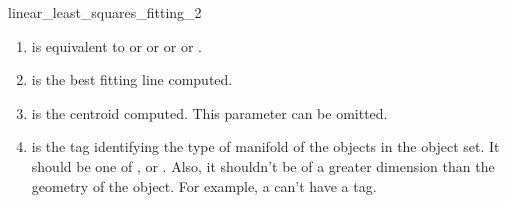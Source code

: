 \begin{ccRefFunction}{linear_least_squares_fitting_2}

\begin{enumerate}
   \item  {} is equivalent to  or 
           or  or  or
          .
   \item  {} is the best fitting line computed.
   \item  {} is the centroid computed. This parameter can be
          omitted.
   \item  {} is the tag identifying the type of manifold of the objects in the object set. It should be one of ,  or . Also, it shouldn't be of a greater dimension than the geometry of the object. For example, a  can't have a  tag.
\end{enumerate}

\end{ccRefFunction}
